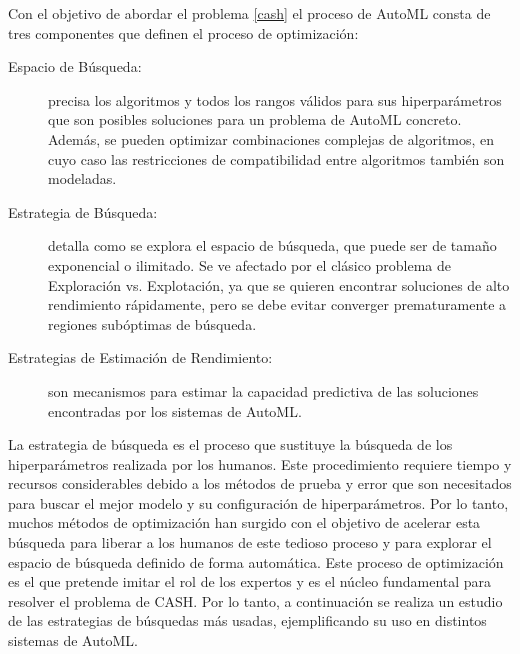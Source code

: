 Con el objetivo de abordar el problema \ref{cash} el proceso de AutoML consta de tres componentes que definen el proceso de optimización:

\begin{description}
	\item[Espacio de Búsqueda:] precisa los algoritmos y todos los rangos válidos para sus hiperparámetros que son posibles soluciones para un problema de AutoML concreto. Además, se pueden optimizar combinaciones complejas de algoritmos, en cuyo caso las restricciones de compatibilidad entre algoritmos también son modeladas.
	\item[Estrategia de Búsqueda:] detalla como se explora el espacio de búsqueda, que puede ser de tamaño exponencial o ilimitado. Se ve afectado por el clásico problema de Exploración vs. Explotación, ya que se quieren encontrar soluciones de alto rendimiento rápidamente, pero se debe evitar converger prematuramente a regiones subóptimas de búsqueda.
	\item[Estrategias de Estimación de Rendimiento:] son mecanismos para estimar la capacidad predictiva de las soluciones encontradas por los sistemas de AutoML.
\end{description}

La estrategia de búsqueda es el proceso que sustituye la búsqueda de los hiperparámetros realizada por los humanos. Este procedimiento requiere tiempo y recursos considerables debido a los métodos de prueba y error que son necesitados para buscar el mejor modelo y su configuración de hiperparámetros. Por lo tanto, muchos métodos de optimización han surgido con el objetivo de acelerar esta búsqueda para liberar a los humanos de este tedioso proceso y para explorar el espacio de búsqueda definido de forma automática. Este proceso de optimización es el que pretende imitar el rol de los expertos y es el núcleo fundamental para resolver el problema de CASH. Por lo tanto, a continuación se realiza un estudio de las estrategias de búsquedas más usadas, ejemplificando su uso en distintos sistemas de AutoML.


